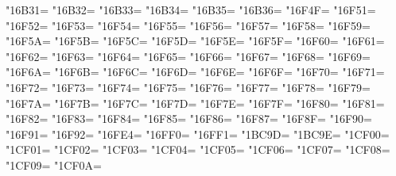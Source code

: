 \XeTeXcharclass"16B31=\KclassCM
\XeTeXcharclass"16B32=\KclassCM
\XeTeXcharclass"16B33=\KclassCM
\XeTeXcharclass"16B34=\KclassCM
\XeTeXcharclass"16B35=\KclassCM
\XeTeXcharclass"16B36=\KclassCM
\XeTeXcharclass"16F4F=\KclassCM
\XeTeXcharclass"16F51=\KclassCM
\XeTeXcharclass"16F52=\KclassCM
\XeTeXcharclass"16F53=\KclassCM
\XeTeXcharclass"16F54=\KclassCM
\XeTeXcharclass"16F55=\KclassCM
\XeTeXcharclass"16F56=\KclassCM
\XeTeXcharclass"16F57=\KclassCM
\XeTeXcharclass"16F58=\KclassCM
\XeTeXcharclass"16F59=\KclassCM
\XeTeXcharclass"16F5A=\KclassCM
\XeTeXcharclass"16F5B=\KclassCM
\XeTeXcharclass"16F5C=\KclassCM
\XeTeXcharclass"16F5D=\KclassCM
\XeTeXcharclass"16F5E=\KclassCM
\XeTeXcharclass"16F5F=\KclassCM
\XeTeXcharclass"16F60=\KclassCM
\XeTeXcharclass"16F61=\KclassCM
\XeTeXcharclass"16F62=\KclassCM
\XeTeXcharclass"16F63=\KclassCM
\XeTeXcharclass"16F64=\KclassCM
\XeTeXcharclass"16F65=\KclassCM
\XeTeXcharclass"16F66=\KclassCM
\XeTeXcharclass"16F67=\KclassCM
\XeTeXcharclass"16F68=\KclassCM
\XeTeXcharclass"16F69=\KclassCM
\XeTeXcharclass"16F6A=\KclassCM
\XeTeXcharclass"16F6B=\KclassCM
\XeTeXcharclass"16F6C=\KclassCM
\XeTeXcharclass"16F6D=\KclassCM
\XeTeXcharclass"16F6E=\KclassCM
\XeTeXcharclass"16F6F=\KclassCM
\XeTeXcharclass"16F70=\KclassCM
\XeTeXcharclass"16F71=\KclassCM
\XeTeXcharclass"16F72=\KclassCM
\XeTeXcharclass"16F73=\KclassCM
\XeTeXcharclass"16F74=\KclassCM
\XeTeXcharclass"16F75=\KclassCM
\XeTeXcharclass"16F76=\KclassCM
\XeTeXcharclass"16F77=\KclassCM
\XeTeXcharclass"16F78=\KclassCM
\XeTeXcharclass"16F79=\KclassCM
\XeTeXcharclass"16F7A=\KclassCM
\XeTeXcharclass"16F7B=\KclassCM
\XeTeXcharclass"16F7C=\KclassCM
\XeTeXcharclass"16F7D=\KclassCM
\XeTeXcharclass"16F7E=\KclassCM
\XeTeXcharclass"16F7F=\KclassCM
\XeTeXcharclass"16F80=\KclassCM
\XeTeXcharclass"16F81=\KclassCM
\XeTeXcharclass"16F82=\KclassCM
\XeTeXcharclass"16F83=\KclassCM
\XeTeXcharclass"16F84=\KclassCM
\XeTeXcharclass"16F85=\KclassCM
\XeTeXcharclass"16F86=\KclassCM
\XeTeXcharclass"16F87=\KclassCM
\XeTeXcharclass"16F8F=\KclassCM
\XeTeXcharclass"16F90=\KclassCM
\XeTeXcharclass"16F91=\KclassCM
\XeTeXcharclass"16F92=\KclassCM
\XeTeXcharclass"16FE4=\KclassCM
\XeTeXcharclass"16FF0=\KclassCM
\XeTeXcharclass"16FF1=\KclassCM
\XeTeXcharclass"1BC9D=\KclassCM
\XeTeXcharclass"1BC9E=\KclassCM
\XeTeXcharclass"1CF00=\KclassCM
\XeTeXcharclass"1CF01=\KclassCM
\XeTeXcharclass"1CF02=\KclassCM
\XeTeXcharclass"1CF03=\KclassCM
\XeTeXcharclass"1CF04=\KclassCM
\XeTeXcharclass"1CF05=\KclassCM
\XeTeXcharclass"1CF06=\KclassCM
\XeTeXcharclass"1CF07=\KclassCM
\XeTeXcharclass"1CF08=\KclassCM
\XeTeXcharclass"1CF09=\KclassCM
\XeTeXcharclass"1CF0A=\KclassCM
